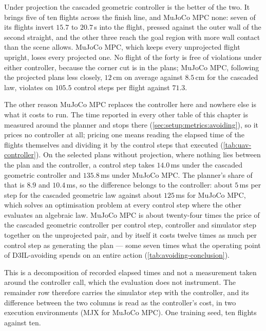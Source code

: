 Under projection the cascaded geometric controller is the better of the two. It brings five of ten flights
across the finish line, and MuJoCo MPC none: seven
of its flights invert $15.7$ to $20.7$\,s into the flight, pressed against the outer wall of the second straight,
and the other three reach the goal region with more wall contact than the scene allows. MuJoCo MPC, which
keeps every unprojected flight upright, loses every projected one. No flight of the forty is free of violations under
either controller, because the corner cut is in the plans; MuJoCo MPC, following the projected plans less
closely, $12$\,cm on average against $8.5$\,cm for the cascaded law, violates on $105.5$ control steps per flight
against $71.3$.

The other reason MuJoCo MPC replaces the controller here and nowhere else is what it costs to run. The
time reported in every other table of this chapter is measured around the planner and stops there
(\autoref{sec:setup:metrics:avoiding}), so it prices no controller at all; pricing one means reading the
elapsed time of the flights themselves and dividing it by the control steps that executed
(\autoref{tab:uav-controller}). On the selected plans without projection, where nothing lies between
the plan and the controller, a control step takes $14.0$\,ms under the cascaded geometric controller and
$135.8$\,ms under MuJoCo MPC. The planner's share of that is $8.9$ and $10.4$\,ms, so the difference belongs to
the controller: about $5$\,ms per step for the cascaded geometric law against about $125$\,ms for MuJoCo MPC,
which solves an optimisation problem at every control step where the other evaluates an algebraic law. MuJoCo
MPC is about twenty-four times the price of the cascaded geometric controller per control step, controller
and simulator step together on the unprojected pair, and by itself it costs twelve times as much per control
step as generating the plan --- some seven times what the operating
point of D3IL-avoiding spends on an entire action (\autoref{tab:avoiding-conclusion}).

This is a decomposition of recorded elapsed times and not a measurement taken around the
controller call, which the evaluation does not instrument. The remainder row therefore carries the
simulator step with the controller, and its difference between the two columns is read as the controller's
cost, in two execution environments (MJX for MuJoCo MPC). One training seed, ten flights against ten.

